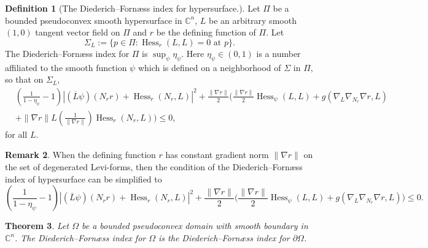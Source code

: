 \documentclass[11pt]{article}
\theoremstyle{plain} \numberwithin{equation}{section}
\newtheorem{theorem}{Theorem}[section]
\theoremstyle{definition}
\newtheorem{definition}[theorem]{Definition}
\newtheorem{remark}[theorem]{Remark}
\DeclareMathOperator{\Hessian}{Hess}
\begin{document}
\begin{definition}[The Diederich--Forn\ae ss index for hypersurface.]\label{dfb}
	Let $\Pi$ be a bounded pseudoconvex smooth hypersurface in $\mathbb{C}^n$,  $L$ be an arbitrary smooth $(1,0)$ tangent vector field on $\Pi$ and $r$ be the defining function of $\Pi$. Let \[\Sigma_L:=\lbrace p\in\Pi: \Hessian_r(L, L)=0 \text{  at  } p\rbrace.\] The Diederich--Forn\ae ss index for $\Pi$ is $\sup_\psi \eta_\psi$. Here $\eta_\psi\in(0,1)$ is a number affiliated to the smooth function $\psi$ which is defined on a neighborhood of $\Sigma$ in $\Pi$, so that on $\Sigma_L$,
	\[\begin{split}
		&\left(\frac{1}{1-\eta_\psi}-1\right)\left|(\overline{L}\psi)(N_rr)+\Hessian_r(N_r, L)\right|^2+\frac{\|\nabla r\|}{2}\Bigg(\frac{\|\nabla r\|}{2}\Hessian_\psi(L, L)+g(\nabla_L\nabla_{N_r}\nabla r, L)\\&+\|\nabla r\|L\left(\frac{1}{\|\nabla r\|}\right)\Hessian_r(N_r, L)\Bigg)\leq 0,
	\end{split}
	\] for all $L$.
\end{definition}

\begin{remark}
	When the defining function $r$ has constant gradient norm $\|\nabla r\|$ on the set of degenerated Levi-forms, then the condition of the Diederich--Forn\ae ss index of hypersurface can be simplified to 	\[
	\left(\frac{1}{1-\eta_\psi}-1\right)\left|(\overline{L}\psi)(N_rr)+\Hessian_r(N_r, L)\right|^2+\frac{\|\nabla r\|}{2}\Bigg(\frac{\|\nabla r\|}{2}\Hessian_\psi(L, L)+g(\nabla_L\nabla_{N_r}\nabla r, L)\Bigg)\leq 0.
	\] 
\end{remark}

\begin{theorem}\label{equiv}
Let $\Omega$ be a bounded pseudoconvex domain with smooth boundary in $\mathbb{C}^n$. The Diederich--Forn\ae ss index for $\Omega$ is the Diederich--Forn\ae ss index for $\partial\Omega$.
\end{theorem}
\end{document}
